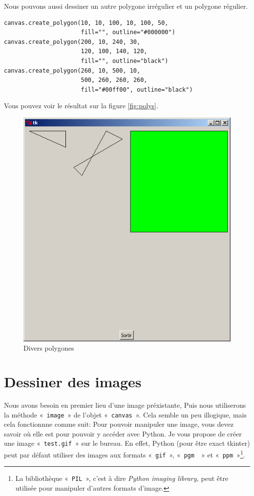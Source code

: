 Nous pouvons aussi dessiner un autre polygone irrégulier et un polygone régulier.

\begin{Verbatim}[frame=single,rulecolor=\color{mbleu}, label=à taper]
canvas.create_polygon(10, 10, 100, 10, 100, 50,
                      fill="", outline="#000000")
canvas.create_polygon(200, 10, 240, 30,
                      120, 100, 140, 120,
                      fill="", outline="black")
canvas.create_polygon(260, 10, 500, 10,
                      500, 260, 260, 260,
                      fill="#00ff00", outline="black")
\end{Verbatim}

Vous pouvez voir le résultat sur la figure \autoref{fig:polys}.
\begin{figure}[h!]
\centering
\includegraphics[scale=0.4]{images/polys}
\caption{Divers polygones}\label{fig:polys}
\end{figure}

\section{Dessiner des images}
\label{sec:dessinimages}

Nous avons besoin en premier lieu d'une image préxistante, Puis nous utiliserons la méthode «~\texttt{image}~» de l'objet «~\texttt{canvas}~». Cela semble un peu illogique, mais cela fonctionnne comme suit: 
Pour pouvoir manipuler une image, vous devez savoir où elle est pour pouvoir y accéder avec Python. Je vous propose de créer une image «~\texttt{test.gif}~» sur le bureau. En effet, Python (pour être exact tkinter) peut par défaut utiliser des images aux formats «~\texttt{gif}~», «~\texttt{pgm~}~» et «~\texttt{ppm}~»\footnote{La bibliothèque «~\texttt{PIL}~», c'est à dire \emph{Python imaging library,} peut être utilisée pour manipuler d'autres formats d'image.}.



